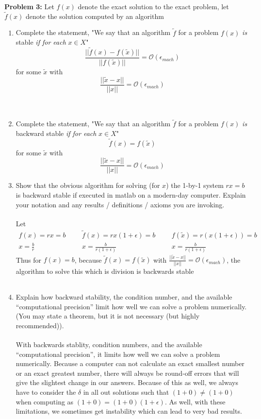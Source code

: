 \documentclass[12pt]{article}
\begin{document}
\newpage
\noindent \textbf{Problem 3: }Let $f(x)$ denote the exact solution to the exact problem, let $\tilde{f}(x)$ denote the solution computed by an algorithm 
	\begin{enumerate}[label = (\alph*)]
		\item Complete the statement, "We say that an algorithm $\tilde{f}$ for a problem $f(x)$ \textit{is} stable \textit{if for each} $x \in X$"
		$$
		\frac{|| \tilde{f}(x) - f(\tilde{x}) ||}{||f(\tilde{x} )||} = \mathcal{O}(\epsilon_{mach}) 
		$$
		for some $\tilde{x}$ with 
		$$
		\frac{|| \tilde{x} - x ||}{|| x ||} = \mathcal{O}(\epsilon_{mach}) 
		$$
		\\ \\
		\item Complete the statement, "We say that an algorithm $\tilde{f}$ for a problem $f(x)$ \textit{is} backward stable \textit{if for each} $x \in X$"
		$$
		\tilde{f}(x) = f(\tilde{x})
		$$
		for some $\tilde{x}$ with 
		$$
		\frac{|| \tilde{x} - x ||}{|| x ||} = \mathcal{O}(\epsilon_{mach}) 
		$$
		\newpage
		\item Show that the obvious algorithm for solving (for $x$) the 1-by-1 system $rx = b$ is backward stable if executed in matlab on a modern-day computer. Explain your notation and any results / definitions / axioms you are invoking.
		\\ \\
		Let 
		\begin{align*}
			f(x) = rx = b &&& \tilde{f}(x) = rx(1 + \epsilon) = b &&& f(\tilde{x}) = r(x(1 + \epsilon)) = b \\
			x = \frac{b}{r} &&& x = \frac{b}{r(1+\epsilon)} &&& x = \frac{b}{r(1+\epsilon)}
		\end{align*}
		Thus for $f(x) = b$, because $\tilde{f}(x) = f(\tilde{x})$ with $\frac{|| \tilde{x} - x ||}{|| x ||} = \mathcal{O}(\epsilon_{mach})$, the algorithm to solve this which is division is backwards stable
		\\ \\ 
		\item Explain how backward stability, the condition number, and the available “computational precision” limit how well we can solve a problem numerically. (You may state a theorem, but it is not necessary (but highly recommended)).
		\\ \\
			With backwards stablity, condition numbers, and the available “computational precision”, it limits how well we can solve a problem numerically.  Because a computer can not calculate an exact smallest number or an exact greatest number, there will always be round-off errors that will give the slightest change in our answers.  Because of this as well, we always have to consider the $\delta$ in all out solutions such that $(1 + 0) \not = (1 + 0)$ when computing as $(1 + 0) = (1 + 0)(1 + \epsilon)$. As well, with these limitations, we sometimes get instability which can lead to very bad results. 
	\end{enumerate}
\end{document}
